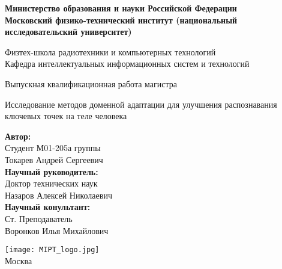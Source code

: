 \begin{center}
    \textbf{Министерство образования и науки Российской Федерации \\
    Московский физико-технический институт (национальный исследовательский университет)} \\
    \vspace{1cm}

    Физтех-школа радиотехники и компьютерных технологий \\

    Кафедра интеллектуальных информационных систем и технологий \\

    \vspace{2em}

    \large{Выпускная квалификационная работа магистра}
\end{center}

\begin{center}
    \vspace{2em}
    \Large{Исследование методов доменной адаптации для улучшения распознавания ключевых точек на теле человека}

    \vspace{\fill}
\end{center}


\begin{flushright}
    \textbf{Автор:} \\
    Студент М01-205а группы \\
    Токарев Андрей Сергеевич \\
    \vspace{2em}
    \textbf{Научный руководитель:} \\
    Доктор технических наук \\
    Назаров Алексей Николаевич \\
    \textbf{Научный конультант:} \\
    Ст. Преподаватель \\
    Воронков Илья Михайлович \\
\end{flushright}

\vspace{1em}

\begin{center}
    \texttt{[image: MIPT\_logo.jpg]}\\
    Москва \the\year{}
\end{center}

\thispagestyle{empty}

\newpage
\setcounter{page}{2}
\fancyfoot[c]{\thepage}
\fancyhead[R]{}